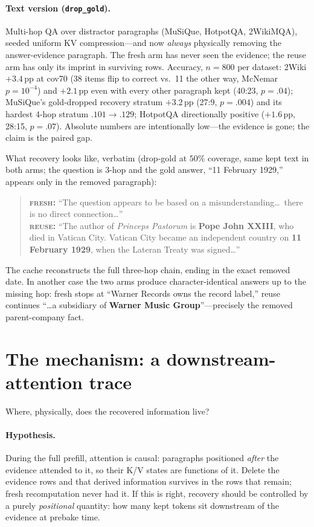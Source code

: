 \documentclass{article} %
\newcommand{\pp}{\,\mathrm{pp}}
\newcommand{\fresh}{\textsc{fresh}}
\newcommand{\reuse}{\textsc{reuse}}
\begin{document}
\paragraph{Text version (\texttt{drop\_gold}).}
Multi-hop QA over distractor paragraphs (MuSiQue, HotpotQA, 2WikiMQA), seeded uniform KV compression---and now \emph{always} physically removing the answer-evidence paragraph. The fresh arm has never seen the evidence; the reuse arm has only its imprint in surviving rows. Accuracy, $n=800$ per dataset: 2Wiki $+3.4\pp$ at cov70 (38 items flip to correct vs.\ 11 the other way, McNemar $p{=}10^{-4}$) and $+2.1\pp$ even with every other paragraph kept (40:23, $p{=}.04$); MuSiQue's gold-dropped recovery stratum $+3.2\pp$ (27:9, $p{=}.004$) and its hardest 4-hop stratum $.101\rightarrow.129$; HotpotQA directionally positive ($+1.6\pp$, 28:15, $p{=}.07$). Absolute numbers are intentionally low---the evidence is gone; the claim is the paired gap.

What recovery looks like, verbatim (drop-gold at $50\%$ coverage, same kept text in both arms; the question is 3-hop and the gold answer, ``11 February 1929,'' appears only in the removed paragraph):

\begin{quote}\small
\textbf{\fresh{}:} ``The question appears to be based on a misunderstanding\ldots\ there is no direct connection\ldots''\\[2pt]
\textbf{\reuse{}:} ``The author of \emph{Princeps Pastorum} is \textbf{Pope John XXIII}, who died in Vatican City. Vatican City became an independent country on \textbf{11 February 1929}, when the Lateran Treaty was signed\ldots''
\end{quote}

The cache reconstructs the full three-hop chain, ending in the exact removed date. In another case the two arms produce character-identical answers up to the missing hop: fresh stops at ``Warner Records owns the record label,'' reuse continues ``\ldots a subsidiary of \textbf{Warner Music Group}''---precisely the removed parent-company fact.

\section{The mechanism: a downstream-attention trace}
\label{sec:mechanism}

Where, physically, does the recovered information live?

\paragraph{Hypothesis.}
During the full prefill, attention is causal: paragraphs positioned \emph{after} the evidence attended to it, so their K/V states are functions of it. Delete the evidence rows and that derived information survives in the rows that remain; fresh recomputation never had it. If this is right, recovery should be controlled by a purely \emph{positional} quantity: how many kept tokens sit downstream of the evidence at prebake time.
\end{document}
